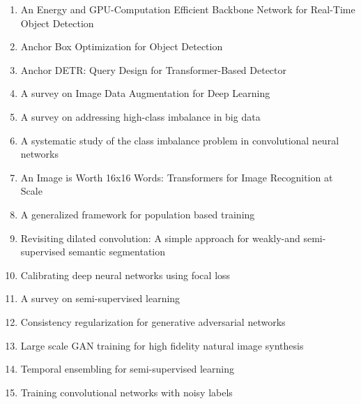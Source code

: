 \documentclass[acmlarge]{acmart}
\begin{document}
\begin{enumerate}
	\item An Energy and GPU-Computation Efficient Backbone Network for Real-Time Object Detection \cite{Lee2019AnEA} 

	\item Anchor Box Optimization for Object Detection \cite{Zhong2020AnchorBO} 

	\item Anchor DETR: Query Design for Transformer-Based Detector \cite{Wang2021AnchorDQ} 

	\item A survey on Image Data Augmentation for Deep Learning \cite{Shorten2019ASO} 

	\item A survey on addressing high-class imbalance in big data \cite{Leevy2018ASO} 

	\item A systematic study of the class imbalance problem in convolutional neural networks \cite{Buda2018ASS} 

	\item An Image is Worth 16x16 Words: Transformers for Image Recognition at Scale \cite{Dosovitskiy2021AnII} 

	\item A generalized framework for population based training \cite{li2019generalized} 

	\item Revisiting dilated convolution: A simple approach for weakly-and semi-supervised semantic segmentation \cite{wei2018revisiting} 

	\item Calibrating deep neural networks using focal loss \cite{mukhoti2020calibrating} 

	\item A survey on semi-supervised learning \cite{van2020survey} 

	\item Consistency regularization for generative adversarial networks \cite{zhang2019consistency} 

	\item Large scale GAN training for high fidelity natural image synthesis \cite{brock2018large} 

	\item Temporal ensembling for semi-supervised learning \cite{laine2016temporal} 

	\item Training convolutional networks with noisy labels \cite{sukhbaatar2014training} 


\end{enumerate}
\end{document}
